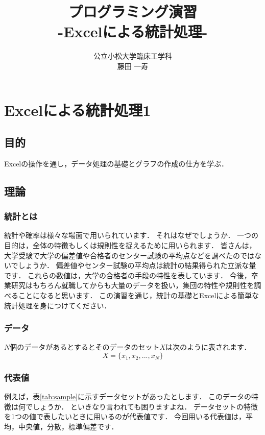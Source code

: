\documentclass[12pt, a4j]{jsreport}
\title{プログラミング演習\\ -Excelによる統計処理-}
\author{公立小松大学臨床工学科 \\ 藤田 一寿}
\date{}
\begin{document}
\maketitle

\chapter{Excelによる統計処理1}

\section{目的}

Excelの操作を通し，データ処理の基礎とグラフの作成の仕方を学ぶ．

\section{理論}

\subsection{統計とは}

統計や確率は様々な場面で用いられています．
それはなぜでしょうか．
一つの目的は，全体の特徴もしくは規則性を捉えるために用いられます．
皆さんは，大学受験で大学の偏差値や合格者のセンター試験の平均点などを調べたのではないでしょうか．
偏差値やセンター試験の平均点は統計の結果得られた立派な量です．
これらの数値は，大学の合格者の手段の特性を表しています．
今後，卒業研究はもちろん就職してからも大量のデータを扱い，集団の特性や規則性を調べることになると思います．
この演習を通じ，統計の基礎とExcelによる簡単な統計処理を身につけてください．

\subsection{データ}

$N$個のデータがあるとするとそのデータのセット$X$は次のように表されます．
\begin{equation}
    \label{eq:2}
    X = \{x_1, x_2, ..., x_N\}
\end{equation}

\subsection{代表値}

例えば，表\ref{tab:sample}に示すデータセットがあったとします．
このデータの特徴は何でしょうか．
といきなり言われても困りますよね．
データセットの特徴を1つの値で表したいときに用いるのが代表値です．
今回用いる代表値は，平均，中央値，分散，標準偏差です．
\end{document}
